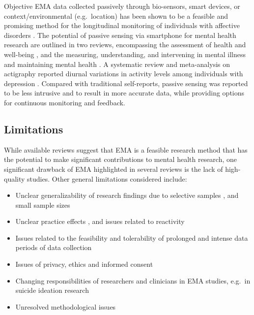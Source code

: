\documentclass[]{book}
\begin{document}
Objective EMA data collected passively through bio-sensors, smart
devices, or context/environmental (e.g.~location) has been shown to be a
feasible and promising method for the longitudinal monitoring of
individuals with affective disorders \citep{Dogan2017, kirchner2016}.
The potential of passive sensing via smartphone for mental health
research are outlined in two reviews, encompassing the assessment of
health and well-being \citep{Cornet2017}, and the measuring,
understanding, and intervening in mental illness and maintaining mental
health \citep{Aung2017}. A systematic review and meta-analysis on
actigraphy reported diurnal variations in activity levels among
individuals with depression \citep{burton2013}. Compared with
traditional self-reports, passive sensing was reported to be less
intrusive and to result in more accurate data, while providing options
for continuous monitoring and feedback.

\subsection{Limitations}\label{limitations}


While available reviews suggest that EMA is a feasible research method
that has the potential to make significant contributions to mental
health research, one significant drawback of EMA highlighted in several
reviews is the lack of high-quality studies. Other general limitations
considered include:

\begin{itemize}
\item
  Unclear generalizability of research findings due to selective samples
  \citep{burton2013}, and small sample sizes \citep{Dogan2017}
\item
  Unclear practice effects \citep{Telford2012}, and issues related to
  reactivity \citep{Shiffman2009}
\item
  Issues related to the feasibility and tolerability of prolonged and
  intense data periods of data collection \citep{Wichers2011}
\item
  Issues of privacy, ethics and informed consent \citep{Cornet2017}
\item
  Changing responsibilities of researchers and clinicians in EMA
  studies, e.g.~in suicide ideation research \citep{Wenze2010}
\item
  Unresolved methodological issues \citep{Dubad2018}
\end{itemize}
\end{document}
